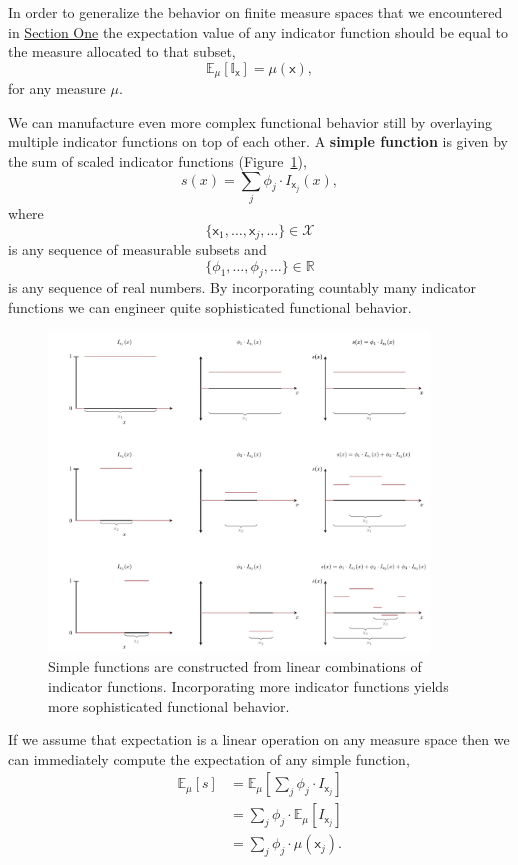 \documentclass[
  letterpaper,
  DIV=11,
  numbers=noendperiod]{scrartcl}
\begin{document}
In order to generalize the behavior on finite measure spaces that we
encountered in \href{@finite_expectation}{Section One} the expectation
value of any indicator function should be equal to the measure allocated
to that subset, \[
\mathbb{E}_{\mu}[ \mathbb{I}_{\mathsf{x}} ]
=
\mu( \mathsf{x} ),
\] for any measure \(\mu\).

We can manufacture even more complex functional behavior still by
overlaying multiple indicator functions on top of each other. A
\textbf{simple function} is given by the sum of scaled indicator
functions (Figure~\ref{fig-simple}), \[
s(x) = \sum_{j} \phi_{j} \cdot I_{\mathsf{x}_{j}}(x),
\] where \[
\{ \mathsf{x}_{1}, \ldots, \mathsf{x}_{j}, \ldots \} \in \mathcal{X}
\] is any sequence of measurable subsets and \[
\{ \phi_{1}, \ldots, \phi_{j}, \ldots \} \in \mathbb{R}
\] is any sequence of real numbers. By incorporating countably many
indicator functions we can engineer quite sophisticated functional
behavior.

\begin{figure}

{\centering \includegraphics[width=0.9\textwidth,height=\textheight]{figures/simple_function/simple_function.pdf}

}

\caption{\label{fig-simple}Simple functions are constructed from linear
combinations of indicator functions. Incorporating more indicator
functions yields more sophisticated functional behavior.}

\end{figure}

If we assume that expectation is a linear operation on any measure space
then we can immediately compute the expectation of any simple function,
\begin{align*}
\mathbb{E}_{\mu}[ s ]
&=
\mathbb{E}_{\mu} \left[ \sum_{j} \phi_{j} \cdot I_{\mathsf{x}_{j}} \right]
\\
&=
\sum_{j} \phi_{j} \cdot \mathbb{E}_{\mu}[ I_{\mathsf{x}_{j}} ]
\\
&=
\sum_{j} \phi_{j} \cdot \mu(\mathsf{x}_{j}).
\end{align*}
\end{document}
